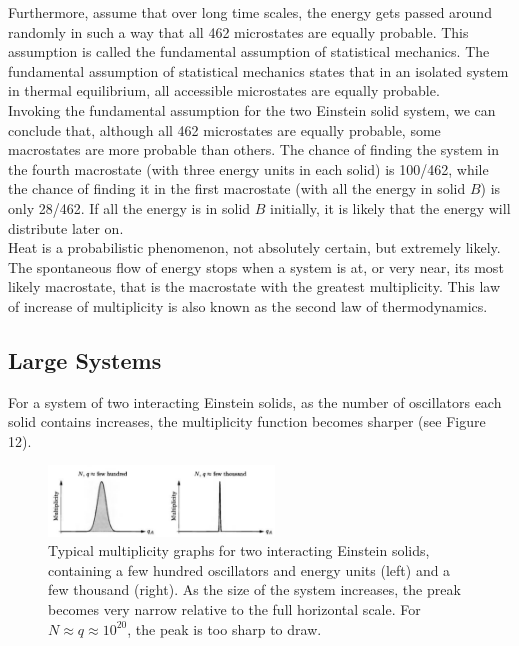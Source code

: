 \documentclass[11pt]{exam}
\begin{document}
\hspace*{10mm}Furthermore, assume that over long time scales, the energy gets passed around randomly in such a way that all 462 microstates are equally probable. This assumption is called the fundamental assumption of statistical mechanics. The fundamental assumption of statistical mechanics states that in an isolated system in thermal equilibrium, all accessible microstates are equally probable.\\
\hspace*{10mm}Invoking the fundamental assumption for the two Einstein solid system, we can conclude that, although all 462 microstates are equally probable, some macrostates are more probable than others. The chance of finding the system in the fourth macrostate (with three energy units in each solid) is 100/462, while the chance of finding it in the first macrostate (with all the energy in solid $B$) is only 28/462. If all the energy is in solid $B$ initially, it is likely that the energy will distribute later on.\\
\hspace*{10mm}Heat is a probabilistic phenomenon, not absolutely certain, but extremely likely. The spontaneous flow of energy stops when a system is at, or very near, its most likely macrostate, that is the macrostate with the greatest multiplicity. This law of increase of multiplicity is also known as the second law of thermodynamics. 
\newpage
\subsection{Large Systems}
For a system of two interacting Einstein solids, as the number of oscillators each solid contains increases, the multiplicity function becomes sharper (see Figure 12). 
\begin{figure}[htp]
    \centering
    \includegraphics[width=6cm]{figure12.png}
    \caption{Typical multiplicity graphs for two interacting Einstein solids, containing a few hundred oscillators and energy units (left) and a few thousand (right). As the size of the system increases, the preak becomes very narrow relative to the full horizontal scale. For $N\approx q\approx 10^{20}$, the peak is too sharp to draw.}
\label{fig:large-systems}
\end{figure}
\end{document}
